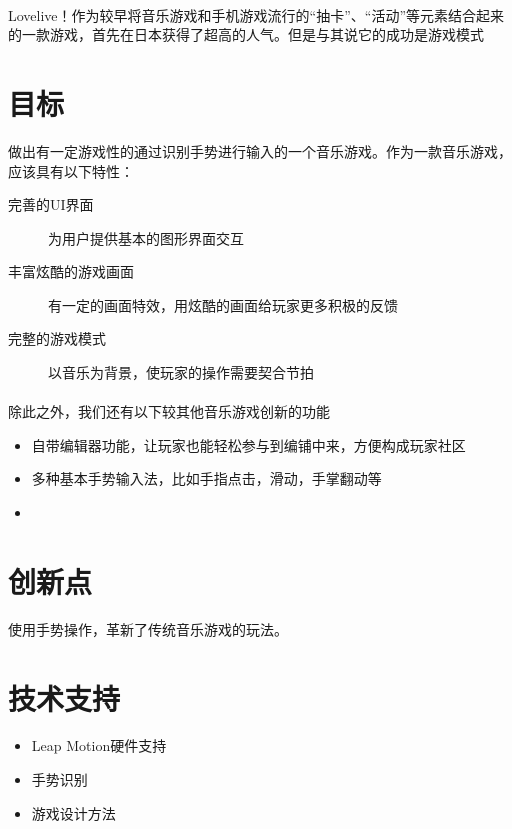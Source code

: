 \documentclass{article} \usepackage{CJK}
\begin{document}
\paragraph{}
Lovelive！作为较早将音乐游戏和手机游戏流行的“抽卡”、“活动”等元素结合起来的一款游戏，首先在日本获得了超高的人气。但是与其说它的成功是游戏模式

\paragraph{}
\section{目标}
做出有一定游戏性的通过识别手势进行输入的一个音乐游戏。作为一款音乐游戏，应该具有以下特性：
\begin{description}
  \item[完善的UI界面] 为用户提供基本的图形界面交互
  \item[丰富炫酷的游戏画面] 有一定的画面特效，用炫酷的画面给玩家更多积极的反馈
  \item[完整的游戏模式] 以音乐为背景，使玩家的操作需要契合节拍
\end{description}
\paragraph{}
除此之外，我们还有以下较其他音乐游戏创新的功能
\begin{itemize}
  \item 自带编辑器功能，让玩家也能轻松参与到编铺中来，方便构成玩家社区
  \item 多种基本手势输入法，比如手指点击，滑动，手掌翻动等
  \item
\end{itemize}

\section{创新点}
使用手势操作，革新了传统音乐游戏的玩法。
\section{技术支持}
\begin{itemize}
  \item Leap Motion硬件支持
  \item 手势识别
  \item 游戏设计方法
\end{itemize}
\end{document}
